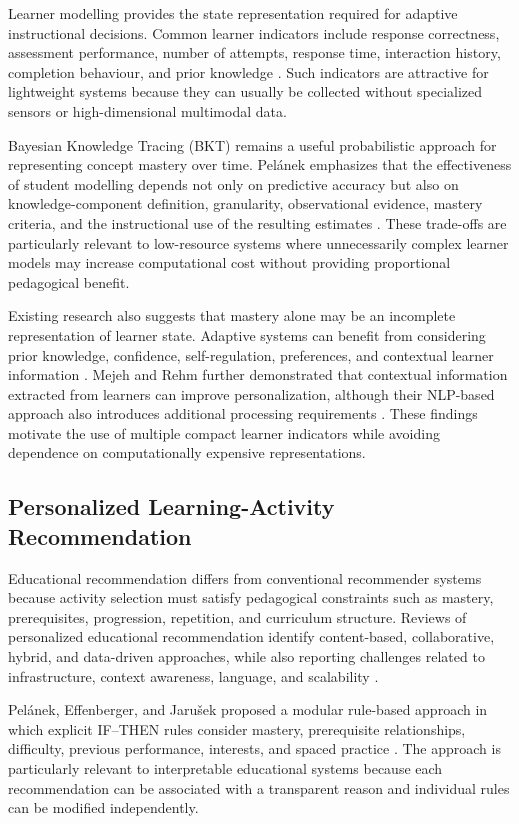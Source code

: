 \documentclass[conference]{IEEEtran}
\begin{document}
Learner modelling provides the state representation required for
adaptive instructional decisions. Common learner indicators include
response correctness, assessment performance, number of attempts,
response time, interaction history, completion behaviour, and prior
knowledge \cite{tan2025,duplooy2024}. Such indicators are attractive for
lightweight systems because they can usually be collected without
specialized sensors or high-dimensional multimodal data.

Bayesian Knowledge Tracing (BKT) remains a useful probabilistic approach
for representing concept mastery over time. Pelánek emphasizes that the
effectiveness of student modelling depends not only on predictive
accuracy but also on knowledge-component definition, granularity,
observational evidence, mastery criteria, and the instructional use of
the resulting estimates \cite{pelanek2025hard}. These trade-offs are
particularly relevant to low-resource systems where unnecessarily
complex learner models may increase computational cost without providing
proportional pedagogical benefit.

Existing research also suggests that mastery alone may be an incomplete
representation of learner state. Adaptive systems can benefit from
considering prior knowledge, confidence, self-regulation, preferences,
and contextual learner information \cite{dai2024,fujii2024,jin2023}.
Mejeh and Rehm further demonstrated that contextual information extracted
from learners can improve personalization, although their NLP-based
approach also introduces additional processing requirements
\cite{mejehrehm2024}. These findings motivate the use of multiple compact
learner indicators while avoiding dependence on computationally
expensive representations.

\subsection{Personalized Learning-Activity Recommendation}

Educational recommendation differs from conventional recommender systems
because activity selection must satisfy pedagogical constraints such as
mastery, prerequisites, progression, repetition, and curriculum
structure. Reviews of personalized educational recommendation identify
content-based, collaborative, hybrid, and data-driven approaches, while
also reporting challenges related to infrastructure, context awareness,
language, and scalability \cite{dhananjaya2024}.

Pelánek, Effenberger, and Jarušek proposed a modular rule-based approach
in which explicit IF--THEN rules consider mastery, prerequisite
relationships, difficulty, previous performance, interests, and spaced
practice \cite{pelanek2024rules}. The approach is particularly relevant
to interpretable educational systems because each recommendation can be
associated with a transparent reason and individual rules can be
modified independently.
\end{document}

